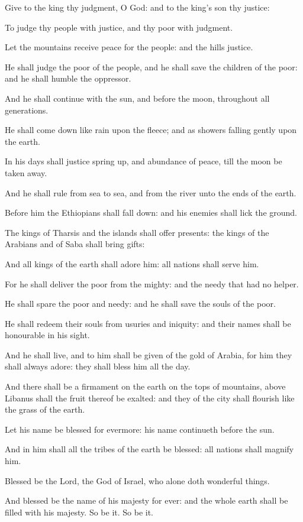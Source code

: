 ﻿\item Give to the king thy judgment, O God: and to the king’s son thy justice:
\item To judge thy people with justice, and thy poor with judgment.
\item Let the mountains receive peace for the people: and the hills justice.
\item He shall judge the poor of the people, and he shall save the children of the poor: and he shall humble the oppressor.
\item And he shall continue with the sun, and before the moon, throughout all generations.
\item He shall come down like rain upon the fleece; and as showers falling gently upon the earth.
\item In his days shall justice spring up, and abundance of peace, till the moon be taken away.
\item And he shall rule from sea to sea, and from the river unto the ends of the earth.
\item Before him the Ethiopians shall fall down: and his enemies shall lick the ground.
\item The kings of Tharsis and the islands shall offer presents: the kings of the Arabians and of Saba shall bring gifts:
\item And all kings of the earth shall adore him: all nations shall serve him.
\item For he shall deliver the poor from the mighty: and the needy that had no helper.
\item He shall spare the poor and needy: and he shall save the souls of the poor.
\item He shall redeem their souls from usuries and iniquity: and their names shall be honourable in his sight.
\item And he shall live, and to him shall be given of the gold of Arabia, for him they shall always adore: they shall bless him all the day.
\item And there shall be a firmament on the earth on the tops of mountains, above Libanus shall the fruit thereof be exalted: and they of the city shall flourish like the grass of the earth.
\item Let his name be blessed for evermore: his name continueth before the sun.
\item And in him shall all the tribes of the earth be blessed: all nations shall magnify him.
\item Blessed be the Lord, the God of Israel, who alone doth wonderful things.
\item And blessed be the name of his majesty for ever: and the whole earth shall be filled with his majesty. So be it. So be it.